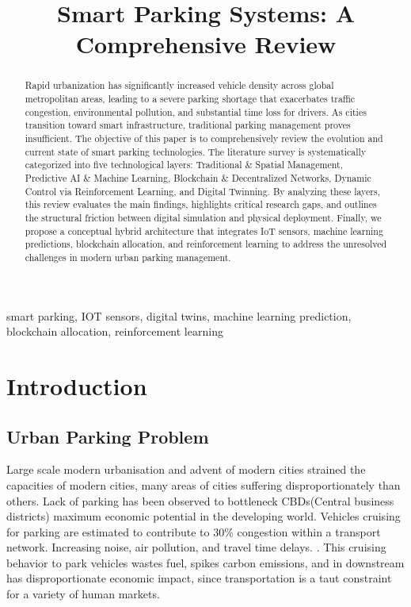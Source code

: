 \documentclass[conference]{IEEEtran}
\begin{document}
\title{Smart Parking Systems: A Comprehensive Review}

\author{
}

\maketitle

\begin{abstract}
Rapid urbanization has significantly increased vehicle density across global metropolitan areas, leading to a severe parking shortage that exacerbates traffic congestion, environmental pollution, and substantial time loss for drivers. As cities transition toward smart infrastructure, traditional parking management proves insufficient. The objective of this paper is to comprehensively review the evolution and current state of smart parking technologies. The literature survey is systematically categorized into five technological layers: Traditional \& Spatial Management, Predictive AI \& Machine Learning, Blockchain \& Decentralized Networks, Dynamic Control via Reinforcement Learning, and Digital Twinning. By analyzing these layers, this review evaluates the main findings, highlights critical research gaps, and outlines the structural friction between digital simulation and physical deployment. Finally, we propose a conceptual hybrid architecture that integrates IoT sensors, machine learning predictions, blockchain allocation, and reinforcement learning to address the unresolved challenges in modern urban parking management.
\end{abstract}

\begin{IEEEkeywords}
smart parking, IOT sensors, digital twins, machine learning prediction, blockchain allocation, reinforcement learning
\end{IEEEkeywords}

\section{Introduction}

\subsection{Urban Parking Problem}
Large scale modern urbanisation and advent of modern cities strained the capacities of modern cities, many areas of cities suffering disproportionately than others. Lack of parking has been observed to bottleneck CBDs(Central business districts) maximum economic potential in the developing world. Vehicles cruising for parking are estimated to contribute to 30\% congestion within a transport network. Increasing noise, air pollution, and travel time delays. \cite{b12}. This cruising behavior to park vehicles wastes fuel, spikes carbon emissions, and in downstream has disproportionate economic impact, since transportation is a taut constraint for a variety of human markets.
\end{document}
